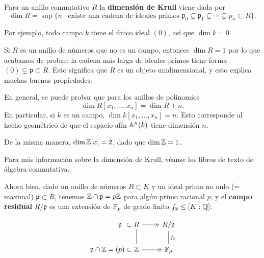 \begin{definicion}
  Para un anillo conmutativo $R$ la \textbf{dimensión de Krull} viene dada por
  \[ \dim R =
     \sup \{ n \mid \text{existe una cadena de ideales primos }
             \mathfrak{p}_0 \subsetneq \mathfrak{p}_1 \subsetneq \cdots
             \subsetneq{p}_n \subset R \}. \]
\end{definicion}

Por ejemplo, todo campo $k$ tiene el único ideal $(0)$, así que $\dim k = 0$.

Si $R$ es un anillo de números que no es un campo, entonces $\dim R = 1$ por lo
que acabamos de probar: la cadena más larga de ideales primos tiene forma
$(0) \subsetneq \mathfrak{p} \subset R$. Esto significa que $R$ es un objeto
unidimensional, y esto explica muchas buenas propiedades.

\begin{ejemplo}
  En general, se puede probar que para los anillos de polinomios
  $$\dim R [x_1,\ldots,x_n] = \dim R + n.$$
  En particular, si $k$ es un campo, $\dim k [x_1,\ldots,x_n] = n$.
  Esto corresponde al hecho geométrico de que el espacio afín
  $\AA^n (k)$ tiene dimensión $n$.

  De la misma manera, $\dim \ZZ[x] = 2$, dado que $\dim \ZZ = 1$.

  Para más información sobre la dimensión de Krull, véanse los libros de texto
  de álgebra conmutativa.
\end{ejemplo}

Ahora bien, dado un anillo de números $R \subset K$ y un ideal primo no nulo
(= maximal) $\mathfrak{p} \subset R$, tenemos $\ZZ \cap \mathfrak{p} = p\ZZ$ para
algún primo racional $p$, y el \textbf{campo residual} $R/\mathfrak{p}$ es una
extensión de $\FF_p$ de grado finito $f_\mathfrak{p} \le [K : \QQ]$.

\[ \begin{tikzcd}
&[-3em] &[-3em] \mathfrak{p} &[-3em] \subset &[-3em] R \ar[->>]{r}\ar[-]{d} & R/\mathfrak{p} \ar[-]{d}{f_\mathfrak{p}} \\
\mathfrak{p} \cap \ZZ & = & (p) & \subset & \ZZ \ar[->>]{r} & \FF_p
\end{tikzcd} \]

